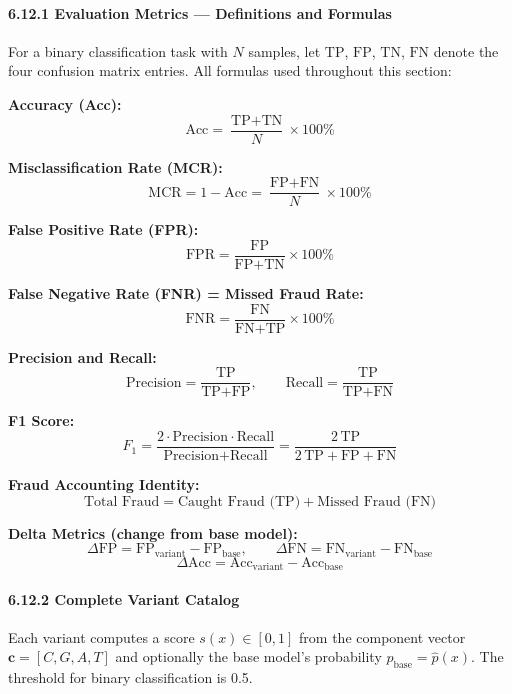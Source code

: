 \documentclass[
  11pt,
]{article}
\begin{document}
\paragraph{6.12.1 Evaluation Metrics — Definitions and
Formulas}\label{evaluation-metrics-definitions-and-formulas}

For a binary classification task with \(N\) samples, let \(\text{TP}\),
\(\text{FP}\), \(\text{TN}\), \(\text{FN}\) denote the four confusion
matrix entries. All formulas used throughout this section:

\textbf{Accuracy (Acc):}
\[\text{Acc} = \frac{\text{TP} + \text{TN}}{N} \times 100\%\]

\textbf{Misclassification Rate (MCR):}
\[\text{MCR} = 1 - \text{Acc} = \frac{\text{FP} + \text{FN}}{N} \times 100\%\]

\textbf{False Positive Rate (FPR):}
\[\text{FPR} = \frac{\text{FP}}{\text{FP} + \text{TN}} \times 100\%\]

\textbf{False Negative Rate (FNR) = Missed Fraud Rate:}
\[\text{FNR} = \frac{\text{FN}}{\text{FN} + \text{TP}} \times 100\%\]

\textbf{Precision and Recall:}
\[\text{Precision} = \frac{\text{TP}}{\text{TP} + \text{FP}}, \qquad \text{Recall} = \frac{\text{TP}}{\text{TP} + \text{FN}}\]

\textbf{F1 Score:}
\[F_1 = \frac{2 \cdot \text{Precision} \cdot \text{Recall}}{\text{Precision} + \text{Recall}} = \frac{2\,\text{TP}}{2\,\text{TP} + \text{FP} + \text{FN}}\]

\textbf{Fraud Accounting Identity:}
\[\text{Total Fraud} = \text{Caught Fraud (TP)} + \text{Missed Fraud (FN)}\]

\textbf{Delta Metrics (change from base model):}
\[\Delta\text{FP} = \text{FP}_{\text{variant}} - \text{FP}_{\text{base}}, \qquad \Delta\text{FN} = \text{FN}_{\text{variant}} - \text{FN}_{\text{base}}\]
\[\Delta\text{Acc} = \text{Acc}_{\text{variant}} - \text{Acc}_{\text{base}}\]

\paragraph{6.12.2 Complete Variant
Catalog}\label{complete-variant-catalog}

Each variant computes a score \(s(x) \in [0,1]\) from the component
vector \(\mathbf{c} = [C, G, A, T]\) and optionally the base model’s
probability \(p_{\text{base}} = \hat{p}(x)\). The threshold for binary
classification is 0.5.
\end{document}
